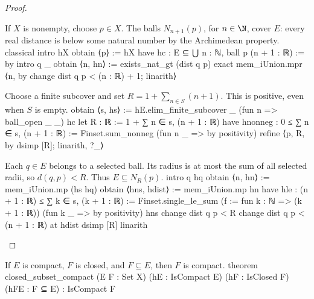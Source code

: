 \begin{proof}
  \begin{lean}{If $X$ is nonempty, choose $p\in X$. The balls $N_{n+1}(p)$, for $n\in\N$, cover $E$: every real distance is below some natural number by the Archimedean property.}
    classical
    intro hX
    obtain ⟨p⟩ := hX
    have hc : E ⊆ ⋃ n : ℕ, ball p (n + 1 : ℝ) := by
      intro q _
      obtain ⟨n, hn⟩ := exists_nat_gt (dist q p)
      exact mem_iUnion.mpr ⟨n, by change dist q p < (n : ℝ) + 1; linarith⟩
  \end{lean}

  \begin{lean}{Choose a finite subcover and set $R=1+\sum_{n\in S}(n+1)$. This is positive, even when $S$ is empty.}
    obtain ⟨s, hs⟩ := hE.elim_finite_subcover _ (fun n => ball_open _ _) hc
    let R : ℝ := 1 + ∑ n ∈ s, (n + 1 : ℝ)
    have hnonneg : 0 ≤ ∑ n ∈ s, (n + 1 : ℝ) :=
      Finset.sum_nonneg (fun n _ => by positivity)
    refine ⟨p, R, by dsimp [R]; linarith, ?_⟩
  \end{lean}

  \begin{lean}{Each $q\in E$ belongs to a selected ball. Its radius is at most the sum of all selected radii, so $d(q,p)<R$. Thus $E\subseteq N_R(p)$.}
    intro q hq
    obtain ⟨n, hn⟩ := mem_iUnion.mp (hs hq)
    obtain ⟨hns, hdist⟩ := mem_iUnion.mp hn
    have hle : (n + 1 : ℝ) ≤ ∑ k ∈ s, (k + 1 : ℝ) :=
      Finset.single_le_sum (f := fun k : ℕ => (k + 1 : ℝ)) (fun k _ => by positivity) hns
    change dist q p < R
    change dist q p < (n + 1 : ℝ) at hdist
    dsimp [R]
    linarith
  \end{lean}

\end{proof}

\begin{proposition} \label{an1:thm:closed-subset-of-compact-set-is-compact}
  \begin{lean}{If $E$ is compact, $F$ is closed, and $F\subseteq E$, then $F$ is compact.}
    theorem closed_subset_compact (E F : Set X) (hE : IsCompact E)
        (hF : IsClosed F) (hFE : F ⊆ E) : IsCompact F
  \end{lean}
\end{proposition}

